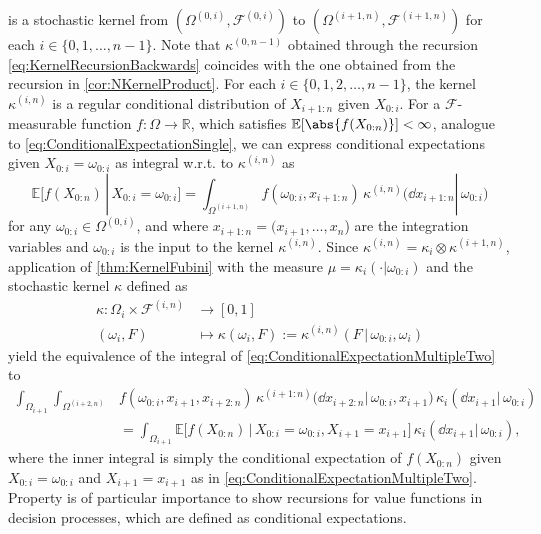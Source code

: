 \documentclass[
    a4paper,
    11pt,
    bibliography=totoc,
    listof=totoc,      
    headinclude=true,
    cleardoublepage=empty,
]{scrbook}
\theoremstyle{plain}
\theoremstyle{definition}
\theoremstyle{remark}
\newcommand{\SetR}{\mathbb R}
\newcommand{\E}{\mathbb E}
\begin{document}
is a stochastic kernel from $(\Omega^{(0,i)}, \mathcal{F}^{(0,i)})$ to 
$(\Omega^{(i+1,n)}, \mathcal{F}^{(i+1,n)})$ for each $i\in\{0,1,\dots,n-1\}$. 
Note that $\kappa^{(0,n-1)}$ obtained through the recursion 
\eqref{eq:KernelRecursionBackwards} coincides with the one obtained from the 
recursion in \cref{cor:NKernelProduct}. For each $i\in\{0,1,2,\dots,n-1\}$, 
the kernel $\kappa^{(i,n)}$ is a regular conditional distribution of 
$X_{i+1:n}$ given $X_{0:i}$. For a $\mathcal{F}$-measurable function 
$f:\Omega\to\SetR$, which satisfies $\E[\abs{f(X_{0:n})}] < \infty$,
analogue to \eqref{eq:ConditionalExpectationSingle}, we can express 
conditional expectations given $X_{0:i}=\omega_{0:i}$ as integral w.r.t. to 
$\kappa^{(i,n)}$ as
\begin{equation}
\label{eq:ConditionalExpectationMultipleTwo}
    \E[
        f(X_{0:n}) \, | \, X_{0:i} = \omega_{0:i}
    ]
    = \int_{\Omega^{(i+1,n)}} 
        f( 
            \omega_{0:i}, x_{i+1:n}
        ) \, 
        \kappa^{(i,n)} \bigl( 
            \dd{x_{i+1:n}} | \, \omega_{0:i} \bigr
        ) 
\end{equation}
for any $\omega_{0:i}\in\Omega^{(0,i)}$, and where $x_{i+1:n} = (x_{i+1},
\dots,x_n$) are the integration variables and $\omega_{0:i}$ is the input to 
the kernel $\kappa^{(i,n)}$. Since $\kappa^{(i,n)} = \kappa_i \otimes 
\kappa^{(i+1,n)}$, application of \cref{thm:KernelFubini} with the measure 
$\mu = \kappa_i(\cdot|\omega_{0:i})$ and the stochastic kernel $\kappa$ 
defined as
\begin{align*}
    \kappa: 
    \Omega_i\times\mathcal{F}^{(i,n)} &\to [0,1] \\
    (\omega_i, F) &\mapsto \kappa(\omega_i, F) 
        := \kappa^{(i,n)}(F\,|\,\omega_{0:i},\omega_i)
\end{align*}
yield the equivalence of the integral of 
\cref{eq:ConditionalExpectationMultipleTwo} to
\begin{equation}
\label{eq:ConditionalExpectationMultipleEquivalence}
\begin{aligned}
    \int_{\Omega_{i+1}} \int_{\Omega^{(i+2,n)}}
        &
        f( 
            \omega_{0:i}, x_{i+1}, x_{i+2:n}
        ) \,
        \kappa^{(i+1:n)}\bigl(
            \dd{x_{i+2:n}} | \, \omega_{0:i}, x_{i+1} \bigr            
        ) \,
        \kappa_i(
            \dd{x_{i+1}} | \, \omega_{0:i}
        )   \\    
    &= \int_{\Omega_{i+1}}
        \E\bigl[
            f(X_{0:n}) \,\big|\, X_{0:i} = \omega_{0:i}, X_{i+1} = x_{i+1}
        \bigr] \,
    \kappa_i(
        \dd{x_{i+1}} | \, \omega_{0:i}
    ), 
\end{aligned}
\end{equation}
where the inner integral is simply the conditional expectation of 
$f(X_{0:n})$ given $X_{0:i}=\omega_{0:i}$ and $ X_{i+1}=x_{i+1}$ as in 
\eqref{eq:ConditionalExpectationMultipleTwo}. Property 
 is of particular importance to 
show recursions for value functions in decision processes, which are defined 
as conditional expectations.
\end{document}
